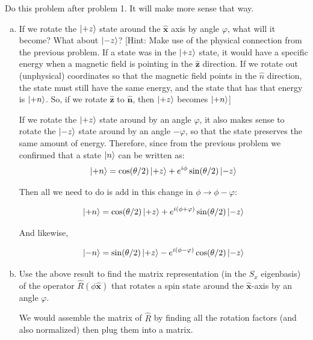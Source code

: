 \documentclass[10pt]{article}
\begin{document}
    Do this problem after problem 1. It will make more sense that way. 

    \begin{enumerate}[(a)]
        \item If we rotate the $\ket{+z}$ state around the $\hat{\mathbf x}$ axis by angle $\varphi$, what will it become? What about $\ket{-z}$? [Hint: Make use of the physical connection from the previous problem. If a state was in the $\ket{+z}$ state, it would have a specific energy when a magnetic field is pointing in the $\hat{\mathbf z}$ direction. If we rotate out (unphysical) coordinates so that the magnetic field points in the $\hat n$ direction, the state must still have the same energy, and the state that has that energy is $\ket{+n}$. So, if we rotate $\hat{\mathbf z}$ to $\hat{\mathbf n}$, then $\ket{+z}$ becomes $\ket{+n}$]
        
        \begin{solution}
            If we rotate the $\ket{+z}$ state around by an angle $\varphi$, it also makes sense to rotate the $\ket{-z}$ state around by an angle $-\varphi$, so that the state preserves the same amount of energy. Therefore, since from the previous problem we confirmed that a state $\ket{n}$ can be written as: 
            \[ \ket{+n} = \cos(\theta/2) \ket{+z} + e^{i\phi} \sin(\theta/2) \ket{-z}\]

            Then all we need to do is add in this change in $\phi \to \phi - \varphi$: 

            \[ \ket{+n} = \cos(\theta/2) \ket{+z} + e^{i(\phi + \varphi)} \sin(\theta/2) \ket{-z}\]

            And likewise, 

            \[ \ket{-n} = \sin(\theta/2) \ket{+z} - e^{i(\phi - \varphi)}\cos(\theta/2)\ket{-z}\] 

        \end{solution}
        \item Use the above result to find the matrix representation (in the $S_x$ eigenbasis) of the operator $\hat R(\phi \hat{\mathbf x})$ that rotates a spin state around the $\hat{\mathbf x}$-axis by an angle $\varphi$.
        
        \begin{solution}
            We would assemble the matrix of $\hat R$ by finding all the rotation factors (and also normalized) then plug them into a matrix.
        \end{solution}
    \end{enumerate}
\end{document}
